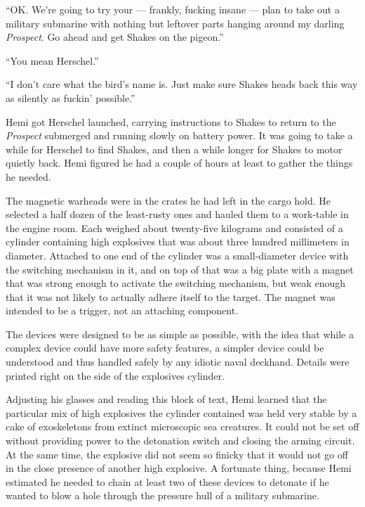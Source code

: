 \documentclass[
]{scrbook}
\begin{document}
``OK. We're going to try your --- frankly, fucking insane --- plan to
take out a military submarine with nothing but leftover parts hanging
around my darling \emph{Prospect}. Go ahead and get Shakes on the
pigeon.''

``You mean Herschel.''

``I don't care what the bird's name is. Just make sure Shakes heads back
this way as silently as fuckin' possible.''

\bigskip

Hemi got Herschel launched, carrying instructions to Shakes to return to
the \emph{Prospect} submerged and running slowly on battery power. It
was going to take a while for Herschel to find Shakes, and then a while
longer for Shakes to motor quietly back. Hemi figured he had a couple of
hours at least to gather the things he needed.

The magnetic warheads were in the crates he had left in the cargo hold.
He selected a half dozen of the least-rusty ones and hauled them to a
work-table in the engine room. Each weighed about twenty-five kilograms
and consisted of a cylinder containing high explosives that was about
three hundred millimeters in diameter. Attached to one end of the
cylinder was a small-diameter device with the switching mechanism in it,
and on top of that was a big plate with a magnet that was strong enough
to activate the switching mechanism, but weak enough that it was not
likely to actually adhere itself to the target. The magnet was intended
to be a trigger, not an attaching component.

The devices were designed to be as simple as possible, with the idea
that while a complex device could have more safety features, a simpler
device could be understood and thus handled safely by any idiotic naval
deckhand. Details were printed right on the side of the explosives
cylinder.

Adjusting his glasses and reading this block of text, Hemi learned that
the particular mix of high explosives the cylinder contained was held
very stable by a cake of exoskeletons from extinct microscopic sea
creatures. It could not be set off without providing power to the
detonation switch and closing the arming circuit. At the same time, the
explosive did not seem so finicky that it would not go off in the close
presence of another high explosive. A fortunate thing, because Hemi
estimated he needed to chain at least two of these devices to detonate
if he wanted to blow a hole through the pressure hull of a military
submarine.
\end{document}
